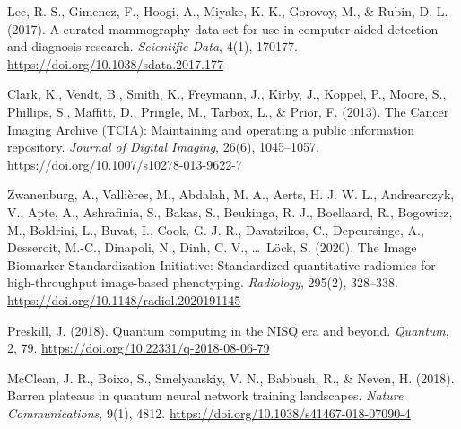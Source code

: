
    Lee, R. S., Gimenez, F., Hoogi, A., Miyake, K. K., Gorovoy, M., \& Rubin, D. L. (2017).
    A curated mammography data set for use in computer-aided detection and diagnosis research.
    \textit{Scientific Data}, 4(1), 170177.
    \url{https://doi.org/10.1038/sdata.2017.177}

    Clark, K., Vendt, B., Smith, K., Freymann, J., Kirby, J., Koppel, P., Moore, S., Phillips, S., Maffitt, D., Pringle, M., Tarbox, L., \& Prior, F. (2013).
    The Cancer Imaging Archive (TCIA): Maintaining and operating a public information repository.
    \textit{Journal of Digital Imaging}, 26(6), 1045--1057.
    \url{https://doi.org/10.1007/s10278-013-9622-7}

    Zwanenburg, A., Valli\`eres, M., Abdalah, M. A., Aerts, H. J. W. L., Andrearczyk, V., Apte, A., Ashrafinia, S., Bakas, S., Beukinga, R. J., Boellaard, R., Bogowicz, M., Boldrini, L., Buvat, I., Cook, G. J. R., Davatzikos, C., Depeursinge, A., Desseroit, M.-C., Dinapoli, N., Dinh, C. V., \ldots\ L\"ock, S. (2020).
    The Image Biomarker Standardization Initiative: Standardized quantitative radiomics for high-throughput image-based phenotyping.
    \textit{Radiology}, 295(2), 328--338.
    \url{https://doi.org/10.1148/radiol.2020191145}

    Preskill, J. (2018).
    Quantum computing in the NISQ era and beyond.
    \textit{Quantum}, 2, 79.
    \url{https://doi.org/10.22331/q-2018-08-06-79}

    McClean, J. R., Boixo, S., Smelyanskiy, V. N., Babbush, R., \& Neven, H. (2018).
    Barren plateaus in quantum neural network training landscapes.
    \textit{Nature Communications}, 9(1), 4812.
    \url{https://doi.org/10.1038/s41467-018-07090-4}

